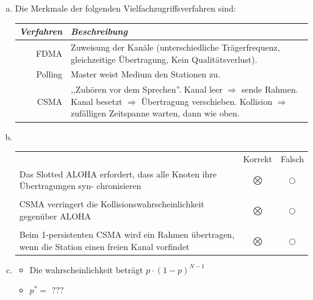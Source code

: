 

\pgfplotsset{compat=1.15}

\renewcommand{\arraystretch}{1.5}

\newcommand\tunderset[2]{\underset{\text{#1}}{\text{#2}}}

\date{Mittwoch 29.1.2020}


\maketitle
\thispagestyle{fancy}

\begin{enumerate}[a)]
	\item  Die Merkmale der folgenden Vielfachzugriffsverfahren sind: \\
	\begin{tabular}{r|p{13cm}}
		\textit{Verfahren} & \textit{Beschreibung} \\ \hline
		FDMA    & Zuweisung der Kanäle (unterschiedliche Trägerfrequenz, gleichzeitige Übertragung, Kein Qualitätsverlust). \\ \hline
		Polling & Master weist Medium den Stationen zu.\\ \hline
		CSMA    & ,,Zuhören vor dem Sprechen''. 
		Kanal leer $\Rightarrow$ sende Rahmen.
		Kanal besetzt $\Rightarrow$ Übertragung verschieben.
		Kollision $\Rightarrow$ zufälligen Zeitspanne warten, dann wie oben. \\ 
	\end{tabular}
	\item { \hfill \\
	\begin{tabular}{p{11.2cm}cc}
													& Korrekt & Falsch \\
		Das Slotted ALOHA erfordert, dass alle Knoten ihre Übertragungen syn-
		chronisieren								& $\bigotimes$   & $\bigcirc$ \\ \\
		CSMA verringert die Kollisionswahrscheinlichkeit gegenüber ALOHA
													& $\bigotimes$   & $\bigcirc$ \\ \\
		Beim 1-persistenten CSMA wird ein Rahmen übertragen, wenn die Station
		einen freien Kanal vorfindet				& $\bigotimes$   & $\bigcirc$     
	\end{tabular}}
	\item \begin{itemize}
		\item Die wahrscheinlichkeit beträgt $p\cdot(1-p)^{N-1}$
		\item $p^*= \,\,???$
	\end{itemize}
\end{enumerate}

